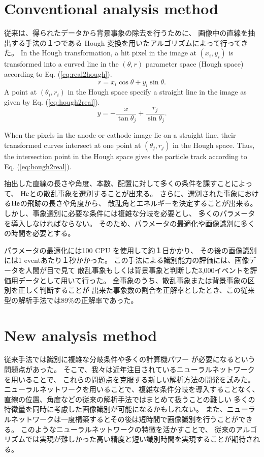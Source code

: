 \documentclass{jps-cp}
\begin{document}
\section{Conventional analysis method}
従来は、得られたデータから背景事象の除去を行うために、
画像中の直線を抽出する手法の１つである
Hough 変換を用いたアルゴリズムによって行ってきた。
In the Hough transformation, a hit pixel in the image at $(x_{i}, y_{i})$ is transformed into
a curved line in the $(\theta, r)$ parameter space (Hough space)
according to Eq. (\ref{eq:real2hough}).
\begin{equation}
  \label{eq:real2hough}
  r = x_{i}\cos\theta+y_{i}\sin\theta. 
\end{equation}
A point at $(\theta_{i}, r_{i})$ in the Hough space specify a straight line
in the image as given by Eq. (\ref{eq:hough2real}).
\begin{equation}
  \label{eq:hough2real}
  y = -\frac{x}{\tan\theta_{j}}+\frac{r_{j}}{\sin\theta_{j}}. 
\end{equation}

When the pixels in the anode or cathode image lie on a straight line,
their transformed curves intersect at one point at $(\theta_{j}, r_{j})$ in the Hough space.
Thus, the intersection point in the Hough space gives the particle track according to Eq. (\ref{eq:hough2real}).

抽出した直線の長さや角度、本数、配置に対して多くの条件を課すことによって、
$\rm{He}$との散乱事象を選別することが出来る。
さらに、選別された事象における$\rm{He}$の飛跡の長さや角度から、
散乱角とエネルギーを決定することが出来る。
しかし、事象選別に必要な条件には複雑な分岐を必要とし、
多くのパラメータを導入しなければならない。
そのため、パラメータの最適化や画像識別に多くの時間を必要とする。

パラメータの最適化には100 CPU を使用して約１日かかり、
その後の画像識別には1 eventあたり１秒かかった。
この手法による識別能力の評価には、画像データを人間が目で見て
散乱事象もしくは背景事象と判断した3,000イベントを評価用データとして用いて行った。
全事象のうち、散乱事象または背景事象の区別を正しく判断することが
出来た事象数の割合を正解率としたとき、この従来型の解析手法では89\%の正解率であった。

\section{New analysis method}

従来手法では識別に複雑な分岐条件や多くの計算機パワー
が必要になるという問題点があった。
そこで、我々は近年注目されているニューラルネットワークを用いることで、
これらの問題点を克服する新しい解析方法の開発を試みた。
ニューラルネットワークを用いることで、複雑な条件分岐を導入することなく、
直線の位置、角度などの従来の解析手法ではまとめて扱うことの難しい
多くの特徴量を同時に考慮した画像識別が可能になるかもしれない。
また、ニューラルネットワークは一度構築するとその後は短時間で画像識別を行うことができる。
このようなニューラルネットワークの特徴を活かすことで、
従来のアルゴリズムでは実現が難しかった高い精度と短い識別時間を実現することが期待される。
\end{document}
